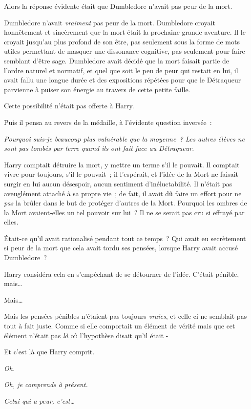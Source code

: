 Alors la réponse évidente était que Dumbledore n'avait pas peur de la mort.

Dumbledore n'avait \emph{vraiment} pas peur de la mort. Dumbledore croyait honnêtement et sincèrement que la mort était la prochaine grande aventure. Il le croyait jusqu'au plus profond de son être, pas seulement sous la forme de mots utiles permettant de masquer une dissonance cognitive, pas seulement pour faire semblant d'être sage. Dumbledore avait décidé que la mort faisait partie de l'ordre naturel et normatif, et quel que soit le peu de peur qui restait en lui, il avait fallu une longue durée et des expositions répétées pour que le Détraqueur parvienne à puiser son énergie au travers de cette petite faille.

Cette possibilité n'était pas offerte à Harry.

Puis il pensa au revers de la médaille, à l'évidente question inversée~:

\emph{Pourquoi suis-je beaucoup plus vulnérable que la moyenne~? Les autres élèves ne sont pas tombés par terre quand ils ont fait face au Détraqueur.}

Harry comptait détruire la mort, y mettre un terme s'il le pouvait. Il comptait vivre pour toujours, s'il le pouvait~; il l'espérait, et l'idée de la Mort ne faisait surgir en lui aucun désespoir, aucun sentiment d'inéluctabilité. Il n'était pas aveuglément attaché à sa propre vie~; de fait, il avait dû faire un effort pour ne \emph{pas} la brûler dans le but de protéger d'autres de la Mort. Pourquoi les ombres de la Mort avaient-elles un tel pouvoir sur lui~? Il ne se serait pas cru si effrayé par elles.

Était-ce qu'il avait rationalisé pendant tout ce temps~? Qui avait eu secrètement si peur de la mort que cela avait tordu ses pensées, lorsque Harry avait accusé Dumbledore~?

Harry considéra cela en s'empêchant de se détourner de l'idée. C'était pénible, mais…

Mais…

Mais les pensées pénibles n'étaient pas toujours \emph{vraies}, et celle-ci ne semblait pas tout à fait juste. Comme si elle comportait un élément de vérité mais que cet élément n'était pas \emph{là} où l'hypothèse disait qu'il était -

Et c'est là que Harry comprit.

\emph{Oh.}

\emph{Oh, je comprends à présent.}

\emph{Celui qui a peur, c'est…}

